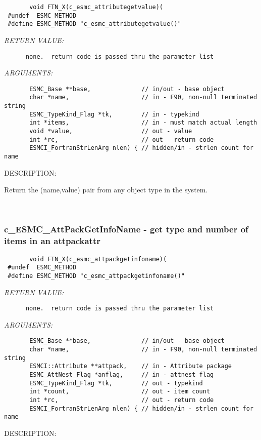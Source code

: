   
\begin{verbatim}       void FTN_X(c_esmc_attributegetvalue)(
 #undef  ESMC_METHOD
 #define ESMC_METHOD "c_esmc_attributegetvalue()"\end{verbatim}{\em RETURN VALUE:}
\begin{verbatim}      none.  return code is passed thru the parameter list
   \end{verbatim}{\em ARGUMENTS:}
\begin{verbatim}       ESMC_Base **base,              // in/out - base object
       char *name,                    // in - F90, non-null terminated string
       ESMC_TypeKind_Flag *tk,        // in - typekind
       int *items,                    // in - must match actual length
       void *value,                   // out - value
       int *rc,                       // out - return code
       ESMCI_FortranStrLenArg nlen) { // hidden/in - strlen count for name
   \end{verbatim}
{\sf DESCRIPTION:\\ }


       Return the (name,value) pair from any object type in the system.
   
 
\mbox{}\hrulefill\ 
 
\subsubsection [c\_ESMC\_AttPackGetInfoName] {c\_ESMC\_AttPackGetInfoName - get type and number of items in an attpackattr}


  
\begin{verbatim}       void FTN_X(c_esmc_attpackgetinfoname)(
 #undef  ESMC_METHOD
 #define ESMC_METHOD "c_esmc_attpackgetinfoname()"\end{verbatim}{\em RETURN VALUE:}
\begin{verbatim}      none.  return code is passed thru the parameter list
   \end{verbatim}{\em ARGUMENTS:}
\begin{verbatim}       ESMC_Base **base,              // in/out - base object
       char *name,                    // in - F90, non-null terminated string
       ESMCI::Attribute **attpack,    // in - Attribute package
       ESMC_AttNest_Flag *anflag,     // in - attnest flag
       ESMC_TypeKind_Flag *tk,        // out - typekind
       int *count,                    // out - item count
       int *rc,                       // out - return code
       ESMCI_FortranStrLenArg nlen) { // hidden/in - strlen count for name
   \end{verbatim}
{\sf DESCRIPTION:\\ }


